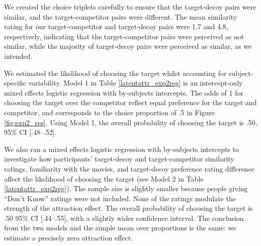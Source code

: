 \documentclass[12pt, a4paper]{article}
\begin{document}
We created the choice triplets carefully to ensure that the target-decoy pairs were similar, and the target-competitor pairs were different. The mean similarity rating for our target-competitor and target-decoy pairs were 1.7 and 4.8, respectively, indicating that the target-competitor pairs were perceived as not similar, while the majority of target-decoy pairs were perceived as similar, as we intended.

We estimated the likelihood of choosing the target whilst accounting for subject-specific variability. Model 1 in Table \ref{latentattr_exp2reg} is an intercept-only mixed effects logistic regression with by-subjects intercepts. The odds of 1 for choosing the target over the competitor reflect equal preference for the target and competitor, and corresponds to the choice proportion of .5 in Figure \ref{fig:exp2_res}. Using Model 1, the overall probability of choosing the target is .50, 95\% CI [.48--.52].

We also ran a mixed effects logistic regression with by-subjects intercepts to investigate how participants' target-decoy and target-competitor similarity ratings, familiarity with the movies, and target-decoy preference rating difference affect the likelihood of choosing the target (see Model 2 in Table \ref{latentattr_exp2reg}). The sample size is slightly smaller because people giving ``Don't Know'' ratings were not included. None of the ratings modulate the strength of the attraction effect. The overall probability of choosing the target is .50 95\% CI [.44--.55], with a slightly wider confidence interval. The conclusion from the two models and the simple mean over proportions is the same: we estimate a precisely zero attraction effect.
\end{document}
